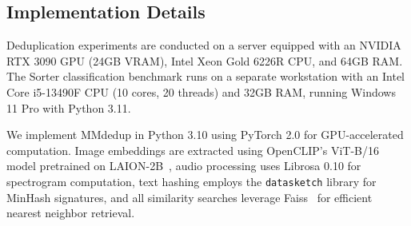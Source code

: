 \documentclass[sigconf, nonacm]{acmart}
\begin{document}

\subsection{Implementation Details}

Deduplication experiments are conducted on a server equipped with an NVIDIA RTX 3090 GPU (24GB VRAM), Intel Xeon Gold 6226R CPU, and 64GB RAM. The Sorter classification benchmark runs on a separate workstation with an Intel Core i5-13490F CPU (10 cores, 20 threads) and 32GB RAM, running Windows 11 Pro with Python 3.11.

We implement MMdedup in Python 3.10 using PyTorch 2.0 for GPU-accelerated computation. Image embeddings are extracted using OpenCLIP's ViT-B/16 model pretrained on LAION-2B~\cite{schuhmann2022laion}, audio processing uses Librosa 0.10 for spectrogram computation, text hashing employs the \texttt{datasketch} library for MinHash signatures, and all similarity searches leverage Faiss~\cite{johnson2019billion} for efficient nearest neighbor retrieval.
\end{document}
